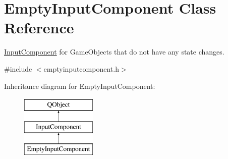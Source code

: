 \hypertarget{classEmptyInputComponent}{\section{Empty\-Input\-Component Class Reference}
\label{classEmptyInputComponent}
}


\hyperlink{classInputComponent}{Input\-Component} for Game\-Objects that do not have any state changes.  




{\ttfamily \#include $<$emptyinputcomponent.\-h$>$}

Inheritance diagram for Empty\-Input\-Component\-:\begin{figure}[H]
\begin{center}
\leavevmode
\includegraphics[height=3.000000cm]{classEmptyInputComponent}
\end{center}
\end{figure}

